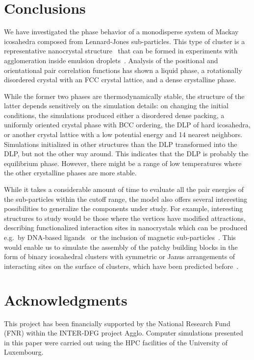 \documentclass[10pt,aps,pre,twocolumn,superscriptaddress,amsmath,amssymb]{revtex4-1}
\begin{document}
\section{Conclusions}

We have investigated the phase behavior of a monodisperse system of Mackay icosahedra composed from Lennard-Jones sub-particles. This type of cluster is a representative nanocrystal structure~\cite{Boles2016} that can be formed in experiments with agglomeration inside emulsion droplets~\cite{Lacava2012,DeNijs2015}.
Analysis of the positional and orientational pair correlation functions has shown a liquid phase, a rotationally disordered crystal with an FCC crystal lattice, and a dense crystalline phase. 

While the former two phases are thermodynamically stable, the structure of the latter depends sensitively on the simulation details: on changing the initial conditions, the simulations produced either a disordered dense packing, a uniformly oriented crystal phase with BCC ordering, the DLP of hard icosahedra, or another crystal lattice with a low potential energy and 14 nearest neighbors.
Simulations initialized in other structures than the DLP transformed into the DLP, but not the other way around. This indicates that the DLP is probably the equilibrium phase. However, there might be a range of low temperatures where the other crystalline phases are more stable.

While it takes a considerable amount of time to evaluate all the pair energies of the sub-particles within the cutoff range, the model also offers several interesting possibilities to generalize the components under study.
For example, interesting structures to study would be those where the vertices have modified attractions, describing functionalized interaction sites in nanocrystals which can be produced e.g.~by DNA-based ligands~\cite{Zhang2013} or the inclusion of magnetic sub-particles~\cite{Ye2016}.
This would enable us to simulate the assembly of the patchy building blocks in the form of binary icosahedral clusters with symmetric or Janus arrangements of interacting sites on the surface of clusters, which have been predicted before~\cite{Mravlak2016}.

\section{Acknowledgments}
This project has been financially supported by the National Research Fund (FNR) within the INTER-DFG project Agglo. Computer simulations presented in this paper were carried out using the HPC facilities of the University of Luxembourg.
\end{document}
